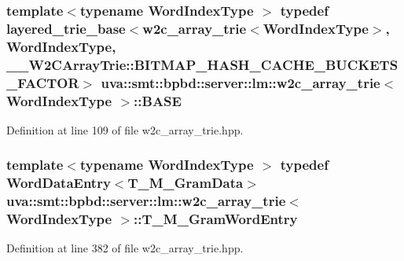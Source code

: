 \subsubsection[{B\+A\+S\+E}]{\setlength{\rightskip}{0pt plus 5cm}template$<$typename Word\+Index\+Type $>$ typedef {\bf layered\+\_\+trie\+\_\+base}$<${\bf w2c\+\_\+array\+\_\+trie}$<${\bf Word\+Index\+Type}$>$, {\bf Word\+Index\+Type}, \+\_\+\+\_\+\+W2\+C\+Array\+Trie\+::\+B\+I\+T\+M\+A\+P\+\_\+\+H\+A\+S\+H\+\_\+\+C\+A\+C\+H\+E\+\_\+\+B\+U\+C\+K\+E\+T\+S\+\_\+\+F\+A\+C\+T\+O\+R$>$ {\bf uva\+::smt\+::bpbd\+::server\+::lm\+::w2c\+\_\+array\+\_\+trie}$<$ {\bf Word\+Index\+Type} $>$\+::{\bf B\+A\+S\+E}}\label{classuva_1_1smt_1_1bpbd_1_1server_1_1lm_1_1w2c__array__trie_aa34a328bdf938c35815589863e49eb6e}


Definition at line 109 of file w2c\+\_\+array\+\_\+trie.\+hpp.

\hypertarget{classuva_1_1smt_1_1bpbd_1_1server_1_1lm_1_1w2c__array__trie_a9b8413a947c884a2affe6f18f93e623b}{}
\subsubsection[{T\+\_\+\+M\+\_\+\+Gram\+Word\+Entry}]{\setlength{\rightskip}{0pt plus 5cm}template$<$typename Word\+Index\+Type $>$ typedef {\bf Word\+Data\+Entry}$<${\bf T\+\_\+\+M\+\_\+\+Gram\+Data}$>$ {\bf uva\+::smt\+::bpbd\+::server\+::lm\+::w2c\+\_\+array\+\_\+trie}$<$ {\bf Word\+Index\+Type} $>$\+::{\bf T\+\_\+\+M\+\_\+\+Gram\+Word\+Entry}\hspace{0.3cm}{\ttfamily [protected]}}\label{classuva_1_1smt_1_1bpbd_1_1server_1_1lm_1_1w2c__array__trie_a9b8413a947c884a2affe6f18f93e623b}


Definition at line 382 of file w2c\+\_\+array\+\_\+trie.\+hpp.

\hypertarget{classuva_1_1smt_1_1bpbd_1_1server_1_1lm_1_1w2c__array__trie_a6ebca6462f9f38f00150fec07ee2bcf9}{}

